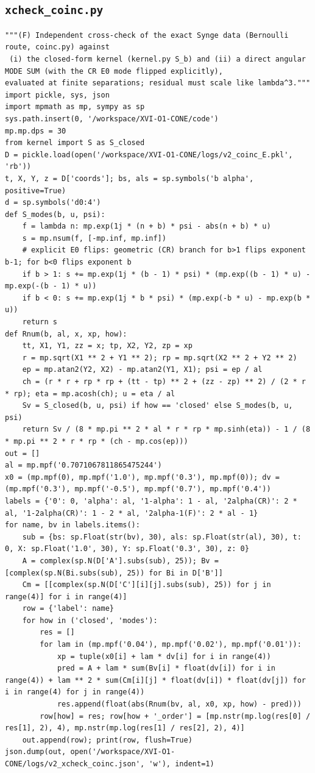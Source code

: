 \documentclass[10pt]{article}
\begin{document}
\subsection{\texttt{xcheck\_coinc.py}}
\begin{lstlisting}
"""(F) Independent cross-check of the exact Synge data (Bernoulli route, coinc.py) against
 (i) the closed-form kernel (kernel.py S_b) and (ii) a direct angular MODE SUM (with the CR E0 mode flipped explicitly),
evaluated at finite separations; residual must scale like lambda^3."""
import pickle, sys, json
import mpmath as mp, sympy as sp
sys.path.insert(0, '/workspace/XVI-O1-CONE/code')
mp.mp.dps = 30
from kernel import S as S_closed
D = pickle.load(open('/workspace/XVI-O1-CONE/logs/v2_coinc_E.pkl', 'rb'))
t, X, Y, z = D['coords']; bs, als = sp.symbols('b alpha', positive=True)
d = sp.symbols('d0:4')
def S_modes(b, u, psi):
    f = lambda n: mp.exp(1j * (n + b) * psi - abs(n + b) * u)
    s = mp.nsum(f, [-mp.inf, mp.inf])
    # explicit E0 flips: geometric (CR) branch for b>1 flips exponent b-1; for b<0 flips exponent b
    if b > 1: s += mp.exp(1j * (b - 1) * psi) * (mp.exp((b - 1) * u) - mp.exp(-(b - 1) * u))
    if b < 0: s += mp.exp(1j * b * psi) * (mp.exp(-b * u) - mp.exp(b * u))
    return s
def Rnum(b, al, x, xp, how):
    tt, X1, Y1, zz = x; tp, X2, Y2, zp = xp
    r = mp.sqrt(X1 ** 2 + Y1 ** 2); rp = mp.sqrt(X2 ** 2 + Y2 ** 2)
    ep = mp.atan2(Y2, X2) - mp.atan2(Y1, X1); psi = ep / al
    ch = (r * r + rp * rp + (tt - tp) ** 2 + (zz - zp) ** 2) / (2 * r * rp); eta = mp.acosh(ch); u = eta / al
    Sv = S_closed(b, u, psi) if how == 'closed' else S_modes(b, u, psi)
    return Sv / (8 * mp.pi ** 2 * al * r * rp * mp.sinh(eta)) - 1 / (8 * mp.pi ** 2 * r * rp * (ch - mp.cos(ep)))
out = []
al = mp.mpf('0.7071067811865475244')
x0 = (mp.mpf(0), mp.mpf('1.0'), mp.mpf('0.3'), mp.mpf(0)); dv = (mp.mpf('0.3'), mp.mpf('-0.5'), mp.mpf('0.7'), mp.mpf('0.4'))
labels = {'0': 0, 'alpha': al, '1-alpha': 1 - al, '2alpha(CR)': 2 * al, '1-2alpha(CR)': 1 - 2 * al, '2alpha-1(F)': 2 * al - 1}
for name, bv in labels.items():
    sub = {bs: sp.Float(str(bv), 30), als: sp.Float(str(al), 30), t: 0, X: sp.Float('1.0', 30), Y: sp.Float('0.3', 30), z: 0}
    A = complex(sp.N(D['A'].subs(sub), 25)); Bv = [complex(sp.N(Bi.subs(sub), 25)) for Bi in D['B']]
    Cm = [[complex(sp.N(D['C'][i][j].subs(sub), 25)) for j in range(4)] for i in range(4)]
    row = {'label': name}
    for how in ('closed', 'modes'):
        res = []
        for lam in (mp.mpf('0.04'), mp.mpf('0.02'), mp.mpf('0.01')):
            xp = tuple(x0[i] + lam * dv[i] for i in range(4))
            pred = A + lam * sum(Bv[i] * float(dv[i]) for i in range(4)) + lam ** 2 * sum(Cm[i][j] * float(dv[i]) * float(dv[j]) for i in range(4) for j in range(4))
            res.append(float(abs(Rnum(bv, al, x0, xp, how) - pred)))
        row[how] = res; row[how + '_order'] = [mp.nstr(mp.log(res[0] / res[1], 2), 4), mp.nstr(mp.log(res[1] / res[2], 2), 4)]
    out.append(row); print(row, flush=True)
json.dump(out, open('/workspace/XVI-O1-CONE/logs/v2_xcheck_coinc.json', 'w'), indent=1)
\end{lstlisting}
\end{document}
